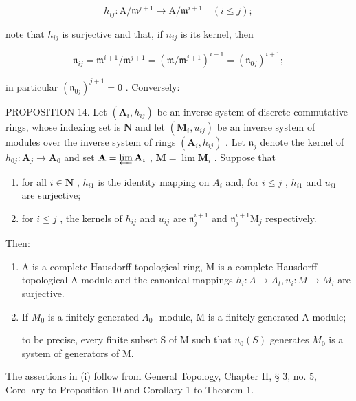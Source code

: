 \[
h _ {i j} \colon \mathrm{A} / \mathfrak {m} ^ {j + 1} \rightarrow \mathrm{A} / \mathfrak {m} ^ {i + 1} \quad (i \leqslant j);
\]

note that \(h_{ij}\) is surjective and that, if \(n_{ij}\) is its kernel, then

\[
\mathfrak {n} _ {i j} = \mathfrak {m} ^ {i + 1} / \mathfrak {m} ^ {j + 1} = (\mathfrak {m} / \mathfrak {m} ^ {j + 1}) ^ {i + 1} = (\mathfrak {n} _ {0 j}) ^ {i + 1};
\]

in particular \((\mathfrak{n}_{0j})^{j + 1} = 0\) . Conversely:

PROPOSITION 14. Let \((\mathbf{A}_i, h_{ij})\) be an inverse system of discrete commutative rings, whose indexing set is \(\mathbf{N}\) and let \((\mathbf{M}_i, u_{ij})\) be an inverse system of modules over the inverse system of rings \((\mathbf{A}_i, h_{ij})\) . Let \(\mathfrak{n}_j\) denote the kernel of \(h_{0j} \colon \mathbf{A}_j \to \mathbf{A}_0\) and set \(\mathbf{A} = \varprojlim \mathbf{A}_i\) , \(\mathbf{M} = \lim \mathbf{M}_i\) . Suppose that

\begin{enumerate}
\def\labelenumi{(\alph{enumi})}
\item
  for all \(i \in \mathbf{N}\) , \(h_{i1}\) is the identity mapping on \(A_i\) and, for \(i \leqslant j\) , \(h_{i1}\) and \(u_{i1}\) are surjective;
\item
  for \(i \leqslant j\) , the kernels of \(h_{ij}\) and \(u_{ij}\) are \(\mathfrak{n}_j^{i+1}\) and \(\mathfrak{n}_j^{i+1}\mathrm{M}_j\) respectively.
\end{enumerate}

Then:

\begin{enumerate}
\def\labelenumi{(\roman{enumi})}
\item
  A is a complete Hausdorff topological ring, M is a complete Hausdorff topological A-module and the canonical mappings \(h_{i}: A \to A_{t}, u_{i}: M \to M_{i}\) are surjective.
\item
  If \(M_{0}\) is a finitely generated \(A_{0}\) -module, M is a finitely generated A-module;

to be precise, every finite subset S of M such that \(u_{0}(S)\) generates \(M_{0}\) is a system of generators of M.
\end{enumerate}

The assertions in (i) follow from General Topology, Chapter II, § 3, no. 5, Corollary to Proposition 10 and Corollary 1 to Theorem 1.

